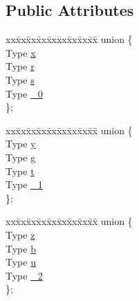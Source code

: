 \subsection*{Public Attributes}
\begin{DoxyCompactItemize}
\item 
\begin{tabbing}
xx\=xx\=xx\=xx\=xx\=xx\=xx\=xx\=xx\=\kill
union \{\\
\>Type \hyperlink{class__vertex3_a77ebded2a16c1bf9c5a49c430ed2cdd5}{x}\\
\>Type \hyperlink{class__vertex3_a6125a752b7c401d1cd2358095230066a}{r}\\
\>Type \hyperlink{class__vertex3_ad6bc128f82b0fe46d9f191a50351b220}{s}\\
\>Type \hyperlink{class__vertex3_a9a8c1b1eba78008ca91cf66df353d611}{\_0}\\
\}; \\

\end{tabbing}\item 
\begin{tabbing}
xx\=xx\=xx\=xx\=xx\=xx\=xx\=xx\=xx\=\kill
union \{\\
\>Type \hyperlink{class__vertex3_abcd5c04cac02df4f40d5aa38f695bd84}{y}\\
\>Type \hyperlink{class__vertex3_afda5a2b8b0a3c5605493b9232cfc53fe}{g}\\
\>Type \hyperlink{class__vertex3_a28a2457f6b56e4357144f17d41c4a76c}{t}\\
\>Type \hyperlink{class__vertex3_a5f665381ced08884fb390bbfef3754f9}{\_1}\\
\}; \\

\end{tabbing}\item 
\begin{tabbing}
xx\=xx\=xx\=xx\=xx\=xx\=xx\=xx\=xx\=\kill
union \{\\
\>Type \hyperlink{class__vertex3_a85e78a70c2a3ec213b5dfd688ea87041}{z}\\
\>Type \hyperlink{class__vertex3_a246eb51f4f972bbac5471706930f24e1}{b}\\
\>Type \hyperlink{class__vertex3_aaf594fdee80ea52362480c9c5564421d}{u}\\
\>Type \hyperlink{class__vertex3_a1c2c36bb8ba8936a1558c95c5c01c7e6}{\_2}\\
\}; \\

\end{tabbing}\end{DoxyCompactItemize}


